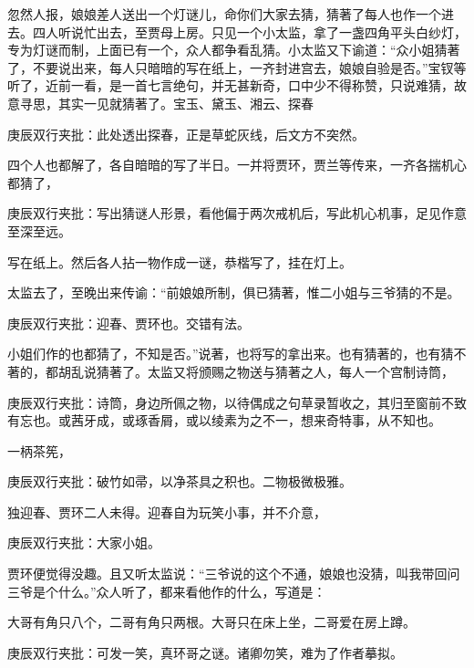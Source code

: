 \begin{parag}


    忽然人报，娘娘差人送出一个灯谜儿，命你们大家去猜，猜著了每人也作一个进去。四人听说忙出去，至贾母上房。只见一个小太监，拿了一盏四角平头白纱灯，专为灯谜而制，上面已有一个，众人都争看乱猜。小太监又下谕道：“众小姐猜著了，不要说出来，每人只暗暗的写在纸上，一齐封进宫去，娘娘自验是否。”宝钗等听了，近前一看，是一首七言绝句，并无甚新奇，口中少不得称赞，只说难猜，故意寻思，其实一见就猜著了。宝玉、黛玉、湘云、探春\begin{note}庚辰双行夹批：此处透出探春，正是草蛇灰线，后文方不突然。\end{note}四个人也都解了，各自暗暗的写了半日。一并将贾环，贾兰等传来，一齐各揣机心都猜了，\begin{note}庚辰双行夹批：写出猜谜人形景，看他偏于两次戒机后，写此机心机事，足见作意至深至远。\end{note}写在纸上。然后各人拈一物作成一谜，恭楷写了，挂在灯上。
\end{parag}


\begin{parag}


    太监去了，至晚出来传谕：“前娘娘所制，俱已猜著，惟二小姐与三爷猜的不是。\begin{note}庚辰双行夹批：迎春、贾环也。交错有法。\end{note}小姐们作的也都猜了，不知是否。”说著，也将写的拿出来。也有猜著的，也有猜不著的，都胡乱说猜著了。太监又将颁赐之物送与猜著之人，每人一个宫制诗筒，\begin{note}庚辰双行夹批：诗筒，身边所佩之物，以待偶成之句草录暂收之，其归至窗前不致有忘也。或茜牙成，或琢香屑，或以绫素为之不一，想来奇特事，从不知也。\end{note}一柄茶筅，\begin{note}庚辰双行夹批：破竹如帚，以净茶具之积也。二物极微极雅。\end{note}独迎春、贾环二人未得。迎春自为玩笑小事，并不介意，\begin{note}庚辰双行夹批：大家小姐。\end{note}贾环便觉得没趣。且又听太监说：“三爷说的这个不通，娘娘也没猜，叫我带回问三爷是个什么。”众人听了，都来看他作的什么，写道是：
\end{parag}


\begin{parag}


    大哥有角只八个，二哥有角只两根。大哥只在床上坐，二哥爱在房上蹲。\begin{note}庚辰双行夹批：可发一笑，真环哥之谜。诸卿勿笑，难为了作者摹拟。\end{note}
\end{parag}


